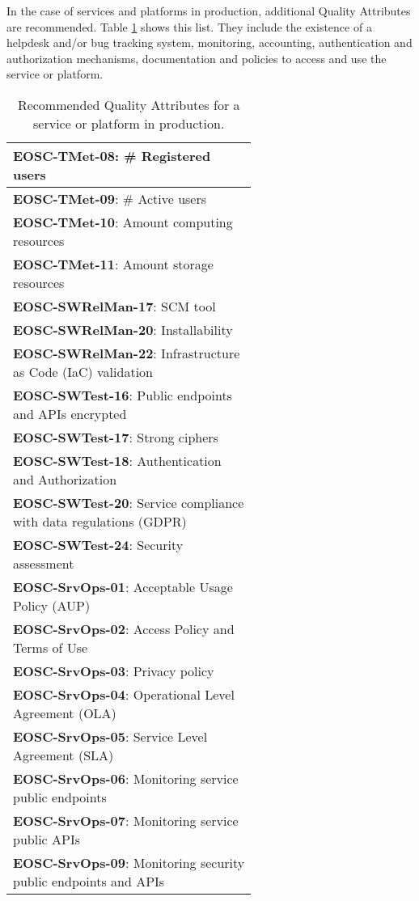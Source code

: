 In the case of services and platforms in production, additional Quality Attributes are recommended. Table \ref{tab:rs_serviceprod} shows this list. They include the existence of a helpdesk and/or bug tracking system, monitoring, accounting, authentication and authorization mechanisms, documentation and policies to access and use the service or platform.

\begin{table}[h]
    \centering
    \scriptsize
    \begin{tabular}{|p{0.6\linewidth}|} \hline

        \textbf{EOSC-TMet-08}: \# Registered users \\ \hline
        \textbf{EOSC-TMet-09}: \# Active users \\ \hline
        \textbf{EOSC-TMet-10}: Amount computing resources \\ \hline
        \textbf{EOSC-TMet-11}: Amount storage resources \\ \hline
        \textbf{EOSC-SWRelMan-17}: SCM tool \\ \hline
        \textbf{EOSC-SWRelMan-20}: Installability \\ \hline
        \textbf{EOSC-SWRelMan-22}: Infrastructure as Code (IaC) validation \\ \hline
        \textbf{EOSC-SWTest-16}: Public endpoints and APIs encrypted \\ \hline
        \textbf{EOSC-SWTest-17}: Strong ciphers \\ \hline
        \textbf{EOSC-SWTest-18}: Authentication and Authorization \\ \hline
        \textbf{EOSC-SWTest-20}: Service compliance with data regulations (GDPR) \\ \hline
        \textbf{EOSC-SWTest-24}: Security assessment \\ \hline
        \textbf{EOSC-SrvOps-01}: Acceptable Usage Policy (AUP) \\ \hline
        \textbf{EOSC-SrvOps-02}: Access Policy and Terms of Use \\ \hline
        \textbf{EOSC-SrvOps-03}: Privacy policy \\ \hline
        \textbf{EOSC-SrvOps-04}: Operational Level Agreement (OLA) \\ \hline
        \textbf{EOSC-SrvOps-05}: Service Level Agreement (SLA) \\ \hline
        \textbf{EOSC-SrvOps-06}: Monitoring service public endpoints \\ \hline
        \textbf{EOSC-SrvOps-07}: Monitoring service public APIs \\ \hline
        \textbf{EOSC-SrvOps-09}: Monitoring security public endpoints and APIs \\ \hline

    \end{tabular}
    \caption{Recommended Quality Attributes for a service or platform in production.}
    \label{tab:rs_serviceprod}
\end{table}

